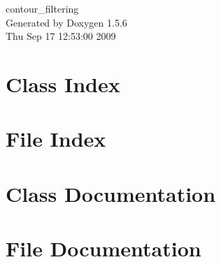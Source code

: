 \documentclass[a4paper]{book}
\begin{document}
\begin{titlepage}
\vspace*{7cm}
\begin{center}
{\Large contour\_\-filtering }\\
\vspace*{1cm}
{\large Generated by Doxygen 1.5.6}\\
\vspace*{0.5cm}
{\small Thu Sep 17 12:53:00 2009}\\
\end{center}
\end{titlepage}
\clearemptydoublepage
{}
\tableofcontents
\clearemptydoublepage
{}
\chapter{Class Index}

\chapter{File Index}

\chapter{Class Documentation}









\chapter{File Documentation}





















\printindex
\end{document}
